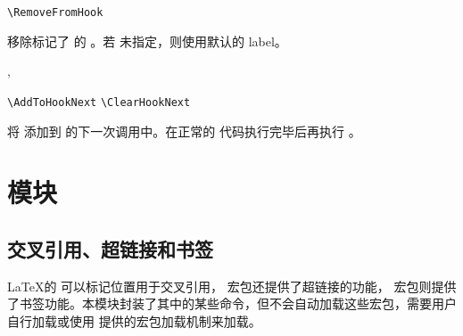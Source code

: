 \documentclass[twoside]{book}
\begin{document}
\begin{function}[module=lthooks]{\RemoveFromHook}
  \begin{syntax}
    \verb|\RemoveFromHook|  
  \end{syntax}
移除标记了  的 。若  未指定，则使用默认的 label。
\end{function}

\begin{function}[module=lthooks]{\AddToHookNext,\ClearHookNext}
  \begin{syntax}
    \verb|\AddToHookNext|  
    \verb|\ClearHookNext| 
  \end{syntax}
将  添加到  的下一次调用中。在正常的  代码执行完毕后再执行 。
\end{function}


\section{模块}\label{sec:module-util}

\subsection{交叉引用、超链接和书签}

\LaTeX 的  可以标记位置用于交叉引用， 宏包还提供了超链接的功能， 宏包则提供了书签功能。本模块封装了其中的某些命令，但不会自动加载这些宏包，需要用户自行加载或使用 \CusTeX 提供的宏包加载机制来加载。
\end{document}
